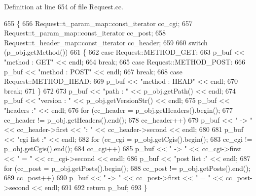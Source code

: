 Definition at line 654 of file Request.\-cc.


\begin{DoxyCode}
655 \{
656   Request::t\_param\_map::const\_iterator  cc\_cgi;
657   Request::t\_param\_map::const\_iterator  cc\_post;
658   Request::t\_header\_map::const\_iterator cc\_header;
659 
660   \textcolor{keywordflow}{switch} (p\_obj.getMethod())
661   \{
662   \textcolor{keywordflow}{case} Request::METHOD\_GET:
663     p\_buf << \textcolor{stringliteral}{"method : GET"} << endl;
664     \textcolor{keywordflow}{break};
665   \textcolor{keywordflow}{case} Request::METHOD\_POST:
666     p\_buf << \textcolor{stringliteral}{"method : POST"} << endl;
667     \textcolor{keywordflow}{break};
668   \textcolor{keywordflow}{case} Request::METHOD\_HEAD:
669     p\_buf << \textcolor{stringliteral}{"method : HEAD"} << endl;
670     \textcolor{keywordflow}{break};
671   \}
672 
673   p\_buf << \textcolor{stringliteral}{"path : "} << p\_obj.getPath() << endl;
674   p\_buf << \textcolor{stringliteral}{"version : "} << p\_obj.getVersionStr() << endl;
675   p\_buf << \textcolor{stringliteral}{"headers :"} << endl;
676   \textcolor{keywordflow}{for} (cc\_header = p\_obj.getHeaders().begin();
677        cc\_header != p\_obj.getHeaders().end();
678        cc\_header++)
679     p\_buf << \textcolor{stringliteral}{" -> "} << cc\_header->first << \textcolor{stringliteral}{": "} << cc\_header->second << endl;
680 
681   p\_buf << \textcolor{stringliteral}{"cgi list :"} << endl;
682   for (cc\_cgi = p\_obj.getCgis().begin();
683        cc\_cgi != p\_obj.getCgis().end();
684        cc\_cgi++)
685     p\_buf << \textcolor{stringliteral}{" -> "} << cc\_cgi->first << \textcolor{stringliteral}{" = "} << cc\_cgi->second << endl;
686   p\_buf << \textcolor{stringliteral}{"post list :"} << endl;
687   for (cc\_post = p\_obj.getPosts().begin();
688        cc\_post != p\_obj.getPosts().end();
689        cc\_post++)
690     p\_buf << \textcolor{stringliteral}{" -> "} << cc\_post->first << \textcolor{stringliteral}{" = "} << cc\_post->second << endl;
691 
692   \textcolor{keywordflow}{return} p\_buf;
693 \}
\end{DoxyCode}


